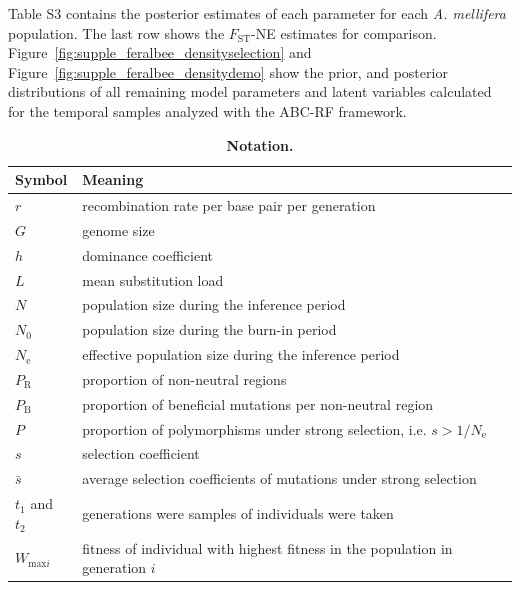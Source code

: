 \documentclass[a4paper, 12pt]{article}
\begin{document}
Table S3 contains the posterior estimates of each parameter for each \textit{A. mellifera} population. The last row shows the $F_{\mathrm{ST}}$-NE estimates for comparison. Figure~\ref{fig:supple_feralbee_densityselection} and Figure~\ref{fig:supple_feralbee_densitydemo} show the prior, and posterior distributions of all remaining model parameters and latent variables calculated for the temporal samples analyzed with the ABC-RF framework.\\







\newpage

\begin{table}[ht]
 \caption{\textbf{Notation.}}
  \label{table:tableS1}
  \begin{tabular}{ll}
   \cmidrule(r){1-2}
    Symbol                  & Meaning \\
    \midrule
    $r$        & recombination rate per base pair per generation \\
    $G$                     & genome size\\
    $h$                     & dominance coefficient\\
    $L$                     & mean substitution load\\
    $N$                     & population size during the inference period\\ 
    $N_{\mathrm{0}}$        & population size during the burn-in period\\
    $N_{\mathrm{e}}$        & effective population size during the inference period\\
    $P_{\mathrm{R}}$        & proportion of non-neutral regions\\
    $P_{\mathrm{B}}$        & proportion of beneficial mutations per non-neutral region\\
    $P$                     & proportion of polymorphisms under strong selection, i.e. $s > 1/ N_{\mathrm{e}}$\\
    $s$                     & selection coefficient\\
    $\bar{s}$               & average selection coefficients of mutations under strong selection\\
    $t_1$ and $t_2$         & generations were samples of individuals were taken\\
    $W_{\mathrm{max}i}$     & fitness of individual with highest fitness in the population in generation $i$\\

\end{tabular}
\end{table}
\end{document}
